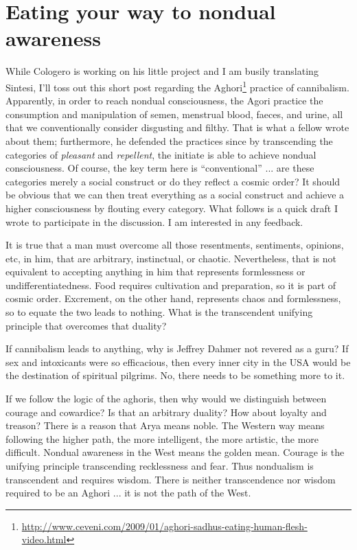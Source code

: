 \section{Eating your way to nondual awareness}

While Cologero is working on his little project and I am busily translating Sintesi, I'll toss out this short post regarding the Aghori\footnote{\url{http://www.ceveni.com/2009/01/aghori-sadhus-eating-human-flesh-video.html}} practice of cannibalism. Apparently, in order to reach nondual consciousness, the Agori practice the consumption and manipulation of semen, menstrual blood, faeces, and urine, all that we conventionally consider disgusting and filthy. That is what a fellow wrote about them; furthermore, he defended the practices since by transcending the categories of \emph{pleasant} and \emph{repellent}, the initiate is able to achieve nondual consciousness. Of course, the key term here is ``conventional'' ... are these categories merely a social construct or do they reflect a cosmic order? It should be obvious that we can then treat everything as a social construct and achieve a higher consciousness by flouting every category. What follows is a quick draft I wrote to participate in the discussion. I am interested in any feedback.

\begin{quotationx}
It is true that a man must overcome all those resentments, sentiments, opinions, etc, in him, that are arbitrary, instinctual, or chaotic. Nevertheless, that is not equivalent to accepting anything in him that represents formlessness or undifferentiatedness. Food requires cultivation and preparation, so it is part of cosmic order. Excrement, on the other hand, represents chaos and formlessness, so to equate the two leads to nothing. What is the transcendent unifying principle that overcomes that duality?

If cannibalism leads to anything, why is Jeffrey Dahmer not revered as a guru? If sex and intoxicants were so efficacious, then every inner city in the USA would be the destination of spiritual pilgrims. No, there needs to be something more to it.

If we follow the logic of the aghoris, then why would we distinguish between courage and cowardice? Is that an arbitrary duality? How about loyalty and treason? There is a reason that Arya means noble. The Western way means following the higher path, the more intelligent, the more artistic, the more difficult. Nondual awareness in the West means the golden mean. Courage is the unifying principle transcending recklessness and fear. Thus nondualism is transcendent and requires wisdom. There is neither transcendence nor wisdom required to be an Aghori ... it is not the path of the West.
\end{quotationx}



